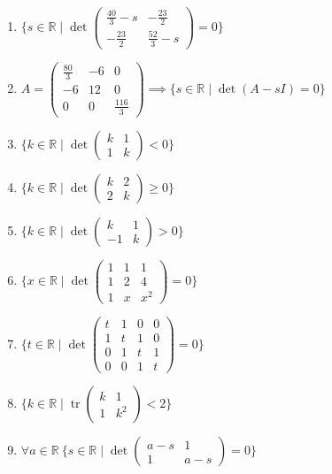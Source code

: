 \documentclass[11pt,a4paper]{article}
\begin{document}
\begin{enumerate}
\item $\displaystyle \{s \in \mathbb{R} \mid \det \begin{pmatrix} \frac{40}{3} - s & -\frac{23}{2} \\ -\frac{23}{2} & \frac{52}{3} - s \end{pmatrix} = 0\}$
\item $\displaystyle A = \begin{pmatrix} \frac{80}{3} & -6 & 0 \\ -6 & 12 & 0 \\ 0 & 0 & \frac{116}{3} \end{pmatrix} \implies \{s \in \mathbb{R} \mid \det\left( A - sI \right) = 0\}$
\item $\displaystyle \{k \in \mathbb{R} \mid \det \begin{pmatrix} k & 1 \\ 1 & k \end{pmatrix} < 0\}$
\item $\displaystyle \{k \in \mathbb{R} \mid \det \begin{pmatrix} k & 2 \\ 2 & k \end{pmatrix} \ge 0\}$
\item $\displaystyle \{k \in \mathbb{R} \mid \det \begin{pmatrix} k & 1 \\ -1 & k \end{pmatrix} > 0\}$
\item $\displaystyle \{x \in \mathbb{R} \mid \det \begin{pmatrix} 1 & 1 & 1 \\ 1 & 2 & 4 \\ 1 & x & x^{2} \end{pmatrix} = 0\}$
\item $\displaystyle \{t \in \mathbb{R} \mid \det \begin{pmatrix} t & 1 & 0 & 0 \\ 1 & t & 1 & 0 \\ 0 & 1 & t & 1 \\ 0 & 0 & 1 & t \end{pmatrix} = 0\}$
\item $\displaystyle \{k \in \mathbb{R} \mid \operatorname{tr} \begin{pmatrix} k & 1 \\ 1 & k^{2} \end{pmatrix} < 2\}$
\item $\displaystyle \forall a \in \mathbb{R}\ \{s \in \mathbb{R} \mid \det \begin{pmatrix} a - s & 1 \\ 1 & a - s \end{pmatrix} = 0\}$
\end{enumerate}
\end{document}
